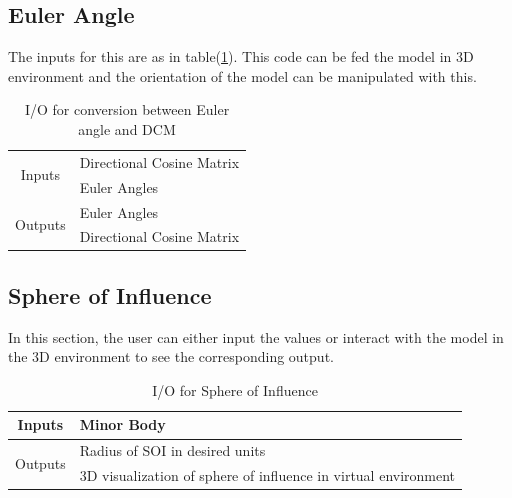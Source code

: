 \documentclass[12pt]{article}
\begin{document}
\subsection{Euler Angle}

The inputs for this are as in table(\ref{eadcm}). This code can be fed the model in 3D environment and the orientation of the model can be manipulated with this.
\begin{table}[H]
\centering
\begin{tabular}{@{}cl@{}}
\toprule
\multirow{2}{*}{Inputs}                      & Directional Cosine Matrix \\ \cmidrule(l){2-2} 
                                             & Euler Angles              \\ \midrule
\multicolumn{1}{r}{\multirow{2}{*}{Outputs}} & Euler Angles              \\ \cmidrule(l){2-2} 
\multicolumn{1}{r}{}                         & Directional Cosine Matrix \\ \bottomrule
\end{tabular}
\caption{I/O for conversion between Euler angle and DCM}
\label{eadcm}
\end{table}
\subsection{Sphere of Influence}
In this section, the user can either input the values or interact with the model in the 3D environment to see the corresponding output.
\begin{table}[H]
\centering
\begin{tabular}{@{}rl@{}}
\toprule
\multicolumn{1}{c}{Inputs} & Minor Body                     \\ \midrule
\multirow{2}{*}{Outputs}   & Radius of SOI in desired units \\ \cmidrule(l){2-2} 
                           & 3D visualization of sphere of influence in virtual environment                         \\ \bottomrule
\end{tabular}
\caption{I/O for Sphere of Influence}
\label{soi}
\end{table}
\end{document}
